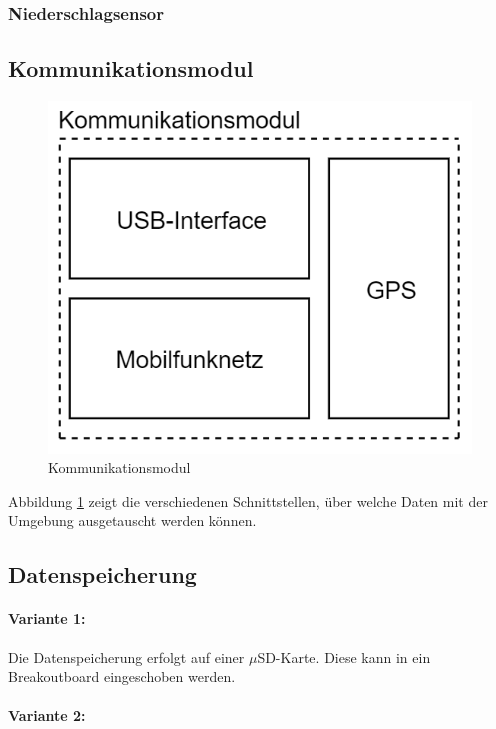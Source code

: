 \subsubsection{Niederschlagsensor}

\subsection{Kommunikationsmodul}
\begin{figure}[h]
\centering
\includegraphics[scale=0.7]{graphics/Kommunikationsmodul.PNG}
\caption{Kommunikationsmodul}
\label{fig:kommunikationsmodul}
\end{figure}
Abbildung \ref{fig:kommunikationsmodul} zeigt die verschiedenen Schnittstellen, über welche Daten mit der Umgebung ausgetauscht werden können.\\
\newpage
\subsection{Datenspeicherung}
\paragraph{Variante 1:}

Die Datenspeicherung erfolgt auf einer $\mu$SD-Karte. Diese kann in ein Breakoutboard eingeschoben werden.\\

\paragraph{Variante 2:}

